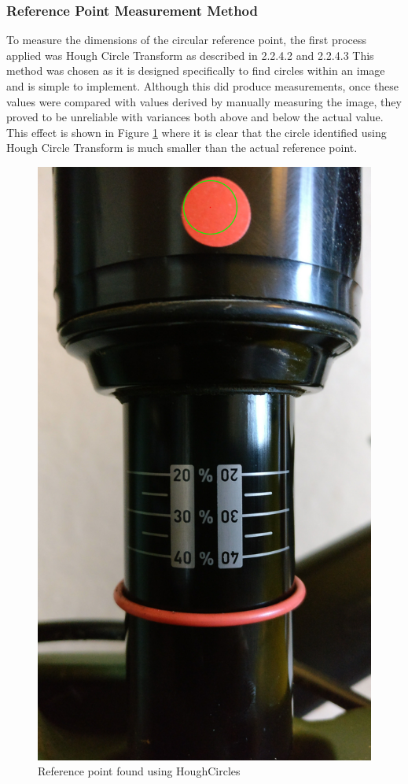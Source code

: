 		\subsubsection{Reference Point Measurement Method}
			To measure the dimensions of the circular reference point, the first process applied was Hough Circle Transform as described in  2.2.4.2 and 2.2.4.3 This method was chosen as it is designed specifically to find circles within an image and is simple to implement. Although this did produce measurements, once these values were compared with values derived by manually measuring the image, they proved to be unreliable with variances both above and below the actual value. This effect is shown in Figure \ref{fig:hough_circle} where it is clear that the circle identified using Hough Circle Transform is much smaller than the actual reference point.
			\begin{figure}[h!]
				\centering
				\includegraphics[scale=0.1,
				trim={30cm 140cm 25cm 0},
				clip]{../images/results/HoughCircles.jpg}
				\caption{Reference point found using HoughCircles}
				\label{fig:hough_circle}
			\end{figure}
